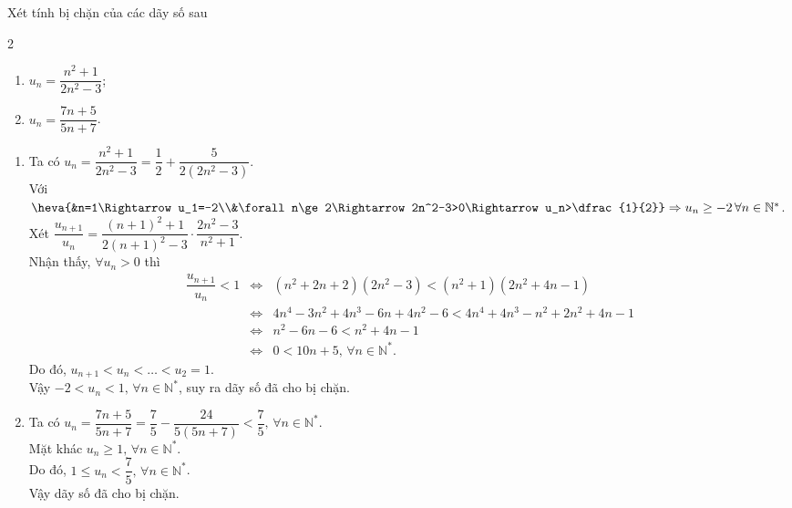 \begin{bt}%
Xét tính bị chặn của các dãy số sau
\begin{multicols}{2}
	\begin{enumerate}
		\item $u_n=\dfrac{n^2+1}{2n^2-3}$;
		\item $u_n=\dfrac{7n+5}{5n+7}$.
	\end{enumerate}
\end{multicols}
	\loigiai 
	{
		\begin{enumerate}
			\item Ta có $u_n=\dfrac{n^2+1}{2n^2-3}=\dfrac{1}{2}+\dfrac{5}{2(2n^2-3)}$.\\
			Với $\heva{&n=1\Rightarrow u_1=-2\\&\forall n\ge 2\Rightarrow 2n^2-3>0\Rightarrow u_n>\dfrac{1}{2}}\Rightarrow u_n\ge -2\, \forall n\in\mathbb{N}^*$.\\
			Xét $\dfrac{u_{n+1}}{u_n}=\dfrac{(n+1)^2+1}{2(n+1)^2-3}\cdot\dfrac{2n^2-3}{n^2+1}$.\\
			Nhận thấy, $\forall u_n>0$ thì
			\allowdisplaybreaks
			\begin{eqnarray*}
				\dfrac{u_{n+1}}{u_n}<1&\Leftrightarrow&(n^2+2n+2)(2n^2-3)<(n^2+1)(2n^2+4n-1)\\
				&\Leftrightarrow& 4n^4-3n^2+4n^3-6n+4n^2-6<4n^4+4n^3-n^2+2n^2+4n-1\\
				&\Leftrightarrow& n^2-6n-6<n^2+4n-1\\
				&\Leftrightarrow& 0<10n+5,\,\forall n\in\mathbb{N}^*.
			\end{eqnarray*}
		Do đó, $u_{n+1}<u_n<\ldots<u_2=1$.\\
		Vậy $-2<u_n<1,\,\forall n\in\mathbb{N}^*$, suy ra dãy số đã cho bị chặn.
			\item Ta có $u_n=\dfrac{7n+5}{5n+7}=\dfrac{7}{5}-\dfrac{24}{5(5n+7)}<\dfrac{7}{5},\,\forall n\in\mathbb{N}^*$.\\
			Mặt khác $u_n\ge 1,\,\forall n\in\mathbb{N}^*$.\\
			Do đó, $1\le u_n<\dfrac{7}{5},\,\forall n\in\mathbb{N}^*$.\\ Vậy dãy số đã cho bị chặn.
		\end{enumerate}
	}
\end{bt}


